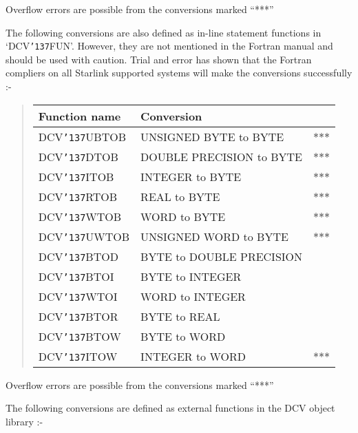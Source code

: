\documentclass[twoside,11pt]{article}
\renewcommand{\_}{{\tt\char'137}}     %
\begin{document}
Overflow errors are possible from the conversions marked ``***''

\newpage

The following conversions are also defined as in-line statement functions in
`DCV\_FUN'. However, they are not mentioned in the Fortran manual and should be
used with caution. Trial and error has shown that the Fortran compliers on all
Starlink supported systems will make the conversions successfully :-

\begin{quote}
\begin{tabular}{lll}
{\bf Function name}      &{\bf Conversion} \\
\hline
DCV\_UBTOB &UNSIGNED BYTE to BYTE          &*** \\
DCV\_DTOB  &DOUBLE PRECISION to BYTE       &*** \\
DCV\_ITOB  &INTEGER to BYTE                &*** \\
DCV\_RTOB  &REAL to BYTE                   &*** \\
DCV\_WTOB  &WORD to BYTE                   &*** \\
DCV\_UWTOB &UNSIGNED WORD to BYTE          &*** \\
DCV\_BTOD  &BYTE to DOUBLE PRECISION \\
DCV\_BTOI  &BYTE to INTEGER \\
DCV\_WTOI  &WORD to INTEGER \\
DCV\_BTOR  &BYTE to REAL \\
DCV\_BTOW  &BYTE to WORD \\
DCV\_ITOW  &INTEGER to WORD                &*** \\
\end{tabular}
\end{quote}

Overflow errors are possible from the conversions marked ``***''

The following conversions are defined as external
functions in the DCV object library :-
\end{document}
